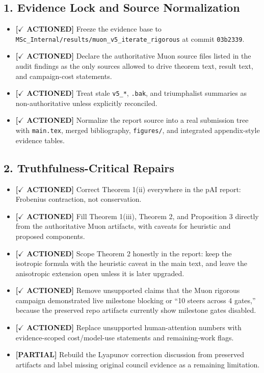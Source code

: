 \documentclass[11pt]{article}
\newcommand{\actioned}{\textbf{\textcolor{green!45!black}{[$\checkmark$ ACTIONED]}}}
\newcommand{\partialdone}{\textbf{\textcolor{orange!75!black}{[PARTIAL]}}}
\begin{document}
\subsection*{1. Evidence Lock and Source Normalization}
\begin{itemize}
  \item \actioned{} Freeze the evidence base to \texttt{MSc\_Internal/results/muon\_v5\_iterate\_rigorous} at commit \texttt{03b2339}.
  \item \actioned{} Declare the authoritative Muon source files listed in the audit findings as the only sources allowed to drive theorem text, result text, and campaign-cost statements.
  \item \actioned{} Treat stale \texttt{v5\_*}, \texttt{.bak}, and triumphalist summaries as non-authoritative unless explicitly reconciled.
  \item \actioned{} Normalize the report source into a real submission tree with \texttt{main.tex}, merged bibliography, \texttt{figures/}, and integrated appendix-style evidence tables.
\end{itemize}

\subsection*{2. Truthfulness-Critical Repairs}
\begin{itemize}
  \item \actioned{} Correct Theorem 1(ii) everywhere in the pAI report: Frobenius contraction, not conservation.
  \item \actioned{} Fill Theorem 1(iii), Theorem 2, and Proposition 3 directly from the authoritative Muon artifacts, with caveats for heuristic and proposed components.
  \item \actioned{} Scope Theorem 2 honestly in the report: keep the isotropic formula with the heuristic caveat in the main text, and leave the anisotropic extension open unless it is later upgraded.
  \item \actioned{} Remove unsupported claims that the Muon rigorous campaign demonstrated live milestone blocking or ``10 steers across 4 gates,'' because the preserved repo artifacts currently show milestone gates disabled.
  \item \actioned{} Replace unsupported human-attention numbers with evidence-scoped cost/model-use statements and remaining-work flags.
  \item \partialdone{} Rebuild the Lyapunov correction discussion from preserved artifacts and label missing original council evidence as a remaining limitation.
\end{itemize}
\end{document}
